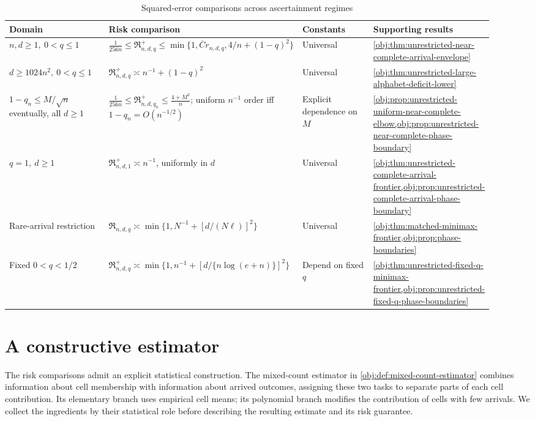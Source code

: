 \documentclass[11pt]{article}
\begin{document}
\begin{table}[htbp]
\centering
\small
\caption{Squared-error comparisons across ascertainment regimes}
\begin{tabular}{p{0.22\linewidth}p{0.31\linewidth}p{0.18\linewidth}p{0.21\linewidth}}
\hline
Domain & Risk comparison & Constants & Supporting results \\
\hline
\(n,d\ge1,\ 0<q\le1\)
&
\(\displaystyle \frac1{256n}\le\mathfrak R^+_{n,d,q}
\le\min\{1,\overline C r_{n,d,q},4/n+(1-q)^2\}\)
&
Universal
&
\cref{obj:thm:unrestricted-near-complete-arrival-envelope}
\\[4pt]
\(d\ge1024n^2,\ 0<q\le1\)
&
\(\mathfrak R^+_{n,d,q}\asymp n^{-1}+(1-q)^2\)
&
Universal
&
\cref{obj:thm:unrestricted-large-alphabet-deficit-lower}
\\[4pt]
\(1-q_n\le M/\sqrt n\) eventually, all \(d\ge1\)
&
\(\displaystyle \frac1{256n}\le\mathfrak R^+_{n,d,q_n}\le\frac{4+M^2}{n}\); uniform \(n^{-1}\) order iff \(1-q_n=O(n^{-1/2})\)
&
Explicit dependence on \(M\)
&
\cref{obj:prop:unrestricted-uniform-near-complete-elbow,obj:prop:unrestricted-near-complete-phase-boundary}
\\[4pt]
\(q=1,\ d\ge1\)
&
\(\mathfrak R^+_{n,d,1}\asymp n^{-1}\), uniformly in \(d\)
&
Universal
&
\cref{obj:thm:unrestricted-complete-arrival-frontier,obj:prop:unrestricted-complete-arrival-phase-boundary}
\\[4pt]
Rare-arrival restriction
&
\(\displaystyle \mathfrak R_{n,d,q}\asymp
\min\{1,N^{-1}+[d/(N\ell)]^2\}\)
&
Universal
&
\cref{obj:thm:matched-minimax-frontier,obj:prop:phase-boundaries}
\\[4pt]
Fixed \(0<q<1/2\)
&
\(\displaystyle \mathfrak R^+_{n,d,q}\asymp
\min\{1,n^{-1}+[d/\{n\log(e+n)\}]^2\}\)
&
Depend on fixed \(q\)
&
\cref{obj:thm:unrestricted-fixed-q-minimax-frontier,obj:prop:unrestricted-fixed-q-phase-boundaries}
\\
\hline
\end{tabular}
\end{table}


\section{A constructive estimator}\label{sec:constructive-estimator}

The risk comparisons admit an explicit statistical construction. The mixed-count estimator in \cref{obj:def:mixed-count-estimator} combines information about cell membership with information about arrived outcomes, assigning these two tasks to separate parts of each cell contribution. Its elementary branch uses empirical cell means; its polynomial branch modifies the contribution of cells with few arrivals. We collect the ingredients by their statistical role before describing the resulting estimate and its risk guarantee.
\end{document}

